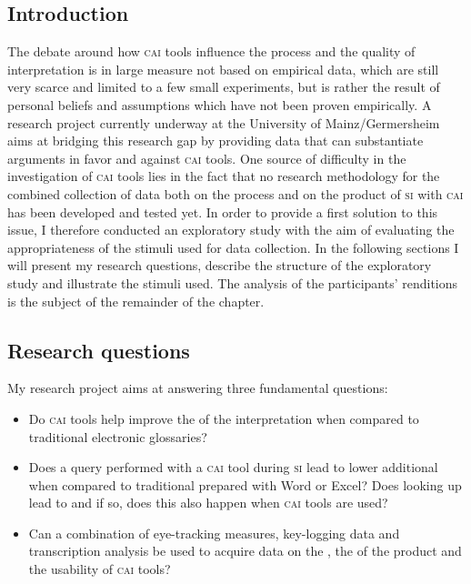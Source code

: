\documentclass[output=paper]{langsci/langscibook}
\begin{document}
\subsection{Introduction}\label{sec:prandi:3.1}
The debate around how \textsc{cai} tools influence the process and the quality of interpretation is in large measure not based on empirical data, which are still very scarce and limited to a few small experiments, but is rather the result of personal beliefs and assumptions which have not been proven empirically. A research project currently underway at the University of Mainz\slash Germersheim \citep{Prandi2016, Prandi2017a, Prandi2017b} aims at bridging this research gap by providing data that can substantiate arguments in favor and against \textsc{cai} tools. One source of difficulty in the investigation of \textsc{cai} tools lies in the fact that no research methodology for the combined collection of data both on the process and on the product of \textsc{si} with \textsc{cai} has been developed and tested yet. In order to provide a first solution to this issue, I therefore conducted an exploratory study with the aim of evaluating the appropriateness of the stimuli used for data collection. In the following sections I will present my research questions, describe the structure of the exploratory study and illustrate the stimuli used. The analysis of the participants’ renditions is the subject of the remainder of the chapter.

\subsection{Research questions}\label{sec:prandi:3.2}
My research project aims at answering three fundamental questions:

\begin{itemize}
\item Do \textsc{cai} tools help improve the  of the interpretation when compared to traditional electronic glossaries?
\item Does a query performed with a \textsc{cai} tool during \textsc{si} lead to lower additional  when compared to traditional  prepared with Word or Excel? Does looking up  lead to  and if so, does this also happen when \textsc{cai} tools are used?
\item Can a combination of eye-tracking measures, key-logging data and transcription analysis be used to acquire data on the , the  of the product and the usability of \textsc{cai} tools?
\end{itemize}
\end{document}
